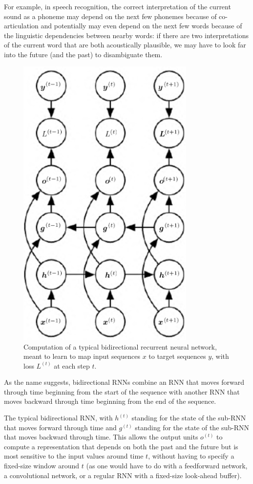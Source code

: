 \documentclass{report}
\begin{document}
For example, in speech recognition, the correct interpretation of the current sound as a phoneme may depend on the next few phonemes because of co-articulation and potentially may even depend on the next few words because of the linguistic dependencies between nearby words: if there are two interpretations of the current word that are both acoustically plausible, we may have to look far into the future (and the past) to disambiguate them.

\begin{figure}[ht]
	\includegraphics[width=250pt]{41}
	\centering
	\caption{Computation of a typical bidirectional recurrent neural network, meant to learn to map input sequences $x$ to target sequences $y$, with loss $L^{(t)}$ at each step $t$.}
\end{figure}

As the name suggests, bidirectional RNNs combine an RNN that moves forward through time beginning from the start of the sequence with another RNN that moves backward through time beginning from the end of the sequence.

The typical bidirectional RNN, with $h^{(t)}$ standing for the state of the sub-RNN that moves forward through time and $g^{(t)}$  standing for the state of the sub-RNN that moves backward through time. This allows the output units $o^{(t)}$ to compute a representation that depends on both the past and the future but is most sensitive to the input values around time $t$, without having to specify a fixed-size window around $t$ (as one would have to do with a feedforward network, a convolutional network, or a regular RNN with a fixed-size look-ahead buffer).
\end{document}

